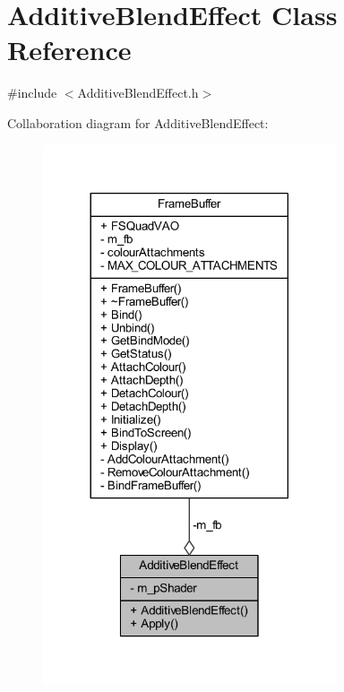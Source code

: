 \hypertarget{class_additive_blend_effect}{}\section{Additive\+Blend\+Effect Class Reference}
\label{class_additive_blend_effect}


{\ttfamily \#include $<$Additive\+Blend\+Effect.\+h$>$}



Collaboration diagram for Additive\+Blend\+Effect\+:\nopagebreak
\begin{figure}[H]
\begin{center}
\leavevmode
\includegraphics[width=245pt]{class_additive_blend_effect__coll__graph}
\end{center}
\end{figure}
